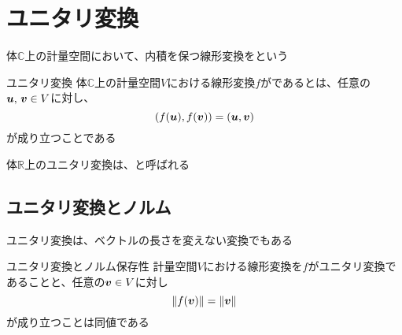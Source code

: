 \documentclass[../../../topic_linear-algebra]{subfiles}
\begin{document}
\sectionline
\section{ユニタリ変換}

体$\mathbb{C}$上の計量空間において、内積を保つ線形変換をという

\begin{definition}{ユニタリ変換}
  体$\mathbb{C}$上の計量空間$V$における線形変換$f$がであるとは、任意の$\vb*{u},\,\vb*{v} \in V$に対し、
  \begin{equation*}
    (f(\vb*{u}),f(\vb*{v})) = (\vb*{u},\vb*{v})
  \end{equation*}
  が成り立つことである
\end{definition}

体$\mathbb{R}$上のユニタリ変換は、と呼ばれる

\subsection{ユニタリ変換とノルム}

ユニタリ変換は、ベクトルの長さを変えない変換でもある

\begin{theorem}{ユニタリ変換とノルム保存性}
  計量空間$V$における線形変換を$f$がユニタリ変換であることと、任意の$\vb*{v} \in V$に対し
  \begin{equation*}
    \|f(\vb*{v})\| = \|\vb*{v}\|
  \end{equation*}
  が成り立つことは同値である
\end{theorem}
\end{document}
